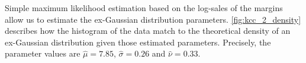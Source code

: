 
Simple maximum likelihood estimation based on the log-sales of the margins allow us to estimate the ex-Gaussian distribution parameters. \autoref{fig:kcc_2_density} describes how the histogram of the data match to the theoretical density of an ex-Gaussian distribution given those estimated parameters. Precisely, the parameter values are $\hat{\mu} = 7.85$, $\hat{\sigma} = 0.26$ and $\hat{\nu} = 0.33$.
\\










